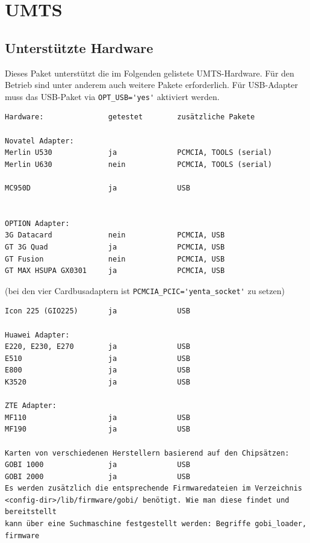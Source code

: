 \section {UMTS}

\subsection{Unterstützte Hardware}

Dieses Paket unterstützt die im Folgenden gelistete UMTS-Hardware.
Für den Betrieb sind unter anderem auch weitere Pakete erforderlich.
Für USB-Adapter muss das USB-Paket via \verb+OPT_USB='yes'+ aktiviert werden.

\begin{verbatim}
Hardware:               getestet        zusätzliche Pakete

Novatel Adapter:
Merlin U530             ja              PCMCIA, TOOLS (serial)
Merlin U630             nein            PCMCIA, TOOLS (serial)

MC950D                  ja              USB


OPTION Adapter:
3G Datacard             nein            PCMCIA, USB
GT 3G Quad              ja              PCMCIA, USB
GT Fusion               nein            PCMCIA, USB
GT MAX HSUPA GX0301     ja              PCMCIA, USB
\end{verbatim}
(bei den vier Cardbusadaptern ist \verb+PCMCIA_PCIC='yenta_socket'+ zu setzen)

\begin{verbatim}
Icon 225 (GIO225)       ja              USB

Huawei Adapter:
E220, E230, E270        ja              USB
E510                    ja              USB
E800                    ja              USB
K3520                   ja              USB

ZTE Adapter:
MF110                   ja              USB
MF190                   ja              USB

Karten von verschiedenen Herstellern basierend auf den Chipsätzen:
GOBI 1000               ja              USB
GOBI 2000               ja              USB
Es werden zusätzlich die entsprechende Firmwaredateien im Verzeichnis
<config-dir>/lib/firmware/gobi/ benötigt. Wie man diese findet und bereitstellt
kann über eine Suchmaschine festgestellt werden: Begriffe gobi_loader, firmware
\end{verbatim}

